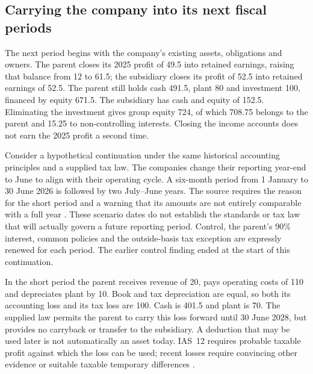 \subsection{Carrying the company into its next fiscal periods}
\label{sec:fiscal-loss-closing}

The next period begins with the company's existing assets, obligations and
owners. The parent closes its 2025 profit of 49.5 into retained earnings,
raising that balance from 12 to 61.5; the subsidiary closes its profit of
52.5 into retained earnings of 52.5. The parent still holds cash 491.5, plant
80 and investment 100, financed by equity 671.5. The subsidiary has cash and
equity of 152.5. Eliminating the investment gives group equity 724, of which
708.75 belongs to the parent and 15.25 to non-controlling interests. Closing
the income accounts does not earn the 2025 profit a second time.

Consider a hypothetical continuation under the same historical accounting
principles and a supplied tax law. The companies change their reporting
year-end to June to align with their operating cycle. A six-month period
from 1 January to 30 June 2026 is followed by two July--June years. The source
requires the reason for the short period and a warning that its amounts are
not entirely comparable with a full year
\citep[IAS~1.36--38]{eu20231803}. These scenario dates do not establish the
standards or tax law that will actually govern a future reporting period.
Control, the parent's 90\% interest, common policies and the outside-basis
tax exception are expressly renewed for each period. The earlier control
finding ended at the start of this continuation.

In the short period the parent receives revenue of 20, pays operating costs
of 110 and depreciates plant by 10. Book and tax depreciation are equal, so
both its accounting loss and its tax loss are 100. Cash is 401.5 and plant
is 70. The supplied law permits the parent to carry this loss forward until
30 June 2028, but provides no carryback or transfer to the subsidiary. A
deduction that may be used later is not automatically an asset today.
IAS~12 requires probable taxable profit against which the loss can be used;
recent losses require convincing other evidence or suitable taxable temporary
differences \citep[IAS~12.34--37]{eu20231803}.

